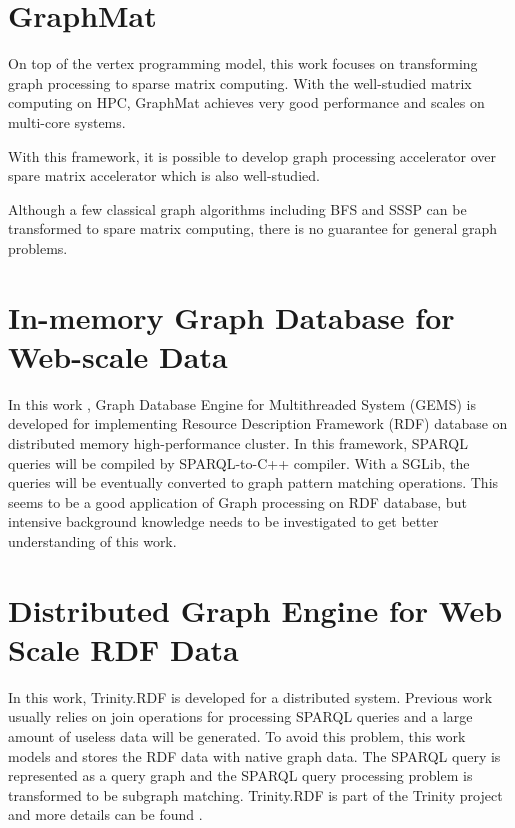 \section{GraphMat}
On top of the vertex programming model, this work \cite{sundaram2015graphmat} focuses on transforming graph
processing to sparse matrix computing. With the well-studied matrix computing on
HPC, GraphMat achieves very good performance and scales on multi-core systems.

With this framework, it is possible to develop graph processing accelerator over
spare matrix accelerator which is also well-studied. 

Although a few classical graph algorithms including BFS and SSSP can be
transformed to spare matrix computing, there is no guarantee for general graph
problems. 

\section{In-memory Graph Database for Web-scale Data}
In this work \cite{Castellana2015in-memory}, Graph Database Engine for Multithreaded System (GEMS) is developed
for implementing Resource Description Framework (RDF) database on distributed memory
high-performance cluster. In this framework, SPARQL queries will be compiled by
SPARQL-to-C++ compiler. With a SGLib, the queries will be eventually converted
to graph pattern matching operations. This seems to be a good application of
Graph processing on RDF database, but intensive background knowledge needs to be
investigated to get better understanding of this work. 

\section{Distributed Graph Engine for Web Scale RDF Data}
In this work, Trinity.RDF \cite{zeng2013distributed} is developed for a
distributed system. Previous work usually relies on join operations for processing
SPARQL queries and a large amount of useless data will be generated. To avoid
this problem, this work models and stores the RDF data with native graph data.
The SPARQL query is represented as a query graph and the SPARQL query processing
problem is transformed to be subgraph matching. Trinity.RDF is part of the Trinity
project and more details can be found \cite{microsoft2013trinity}.
